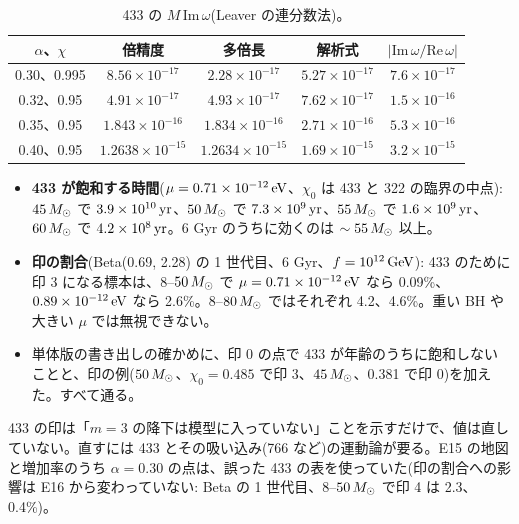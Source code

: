 \begin{table}[H]
\centering\small
\begin{tabular}{ccccc}
\toprule
$\alpha$、$\chi$ & 倍精度 & 多倍長 & 解析式 & $|\mathrm{Im}\,\omega/\mathrm{Re}\,\omega|$\\
\midrule
0.30、0.995 & $8.56\times10^{-17}$ & $2.28\times10^{-17}$ & $5.27\times10^{-17}$ & $7.6\times10^{-17}$\\
0.32、0.95 & $4.91\times10^{-17}$ & $4.93\times10^{-17}$ & $7.62\times10^{-17}$ & $1.5\times10^{-16}$\\
0.35、0.95 & $1.843\times10^{-16}$ & $1.834\times10^{-16}$ & $2.71\times10^{-16}$ & $5.3\times10^{-16}$\\
0.40、0.95 & $1.2638\times10^{-15}$ & $1.2634\times10^{-15}$ & $1.69\times10^{-15}$ & $3.2\times10^{-15}$\\
\bottomrule
\end{tabular}
\caption{433 の $M\,\mathrm{Im}\,\omega$(Leaver の連分数法)。}
\label{tab:e17prec}
\end{table}

\begin{result}
\begin{itemize}
\item \textbf{433 が飽和する時間}($\mu=0.71\times10^{-12}\,\mathrm{eV}$、$\chi_0$ は 433 と 322 の臨界の中点): $45\,M_\odot$ で $3.9\times10^{10}\,\mathrm{yr}$、$50\,M_\odot$ で $7.3\times10^9\,\mathrm{yr}$、$55\,M_\odot$ で $1.6\times10^9\,\mathrm{yr}$、$60\,M_\odot$ で $4.2\times10^8\,\mathrm{yr}$。6 Gyr のうちに効くのは $\sim55\,M_\odot$ 以上。
\item \textbf{印の割合}(Beta(0.69, 2.28) の 1 世代目、6 Gyr、$f=10^{12}\,\mathrm{GeV}$): 433 のために印 3 になる標本は、$8$--$50\,M_\odot$ で $\mu=0.71\times10^{-12}\,\mathrm{eV}$ なら 0.09\%、$0.89\times10^{-12}\,\mathrm{eV}$ なら 2.6\%。$8$--$80\,M_\odot$ ではそれぞれ 4.2、4.6\%。重い BH や大きい $\mu$ では無視できない。
\item 単体版の書き出しの確かめに、印 0 の点で 433 が年齢のうちに飽和しないことと、印の例($50\,M_\odot$、$\chi_0=0.485$ で印 3、$45\,M_\odot$、0.381 で印 0)を加えた。すべて通る。
\end{itemize}
\end{result}

\begin{caveat}
433 の印は「$m=3$ の降下は模型に入っていない」ことを示すだけで、値は直していない。直すには 433 とその吸い込み(766 など)の運動論が要る。E15 の地図と増加率のうち $\alpha=0.30$ の点は、誤った 433 の表を使っていた(印の割合への影響は E16 から変わっていない: Beta の 1 世代目、$8$--$50\,M_\odot$ で印 4 は 2.3、0.4\%)。
\end{caveat}
